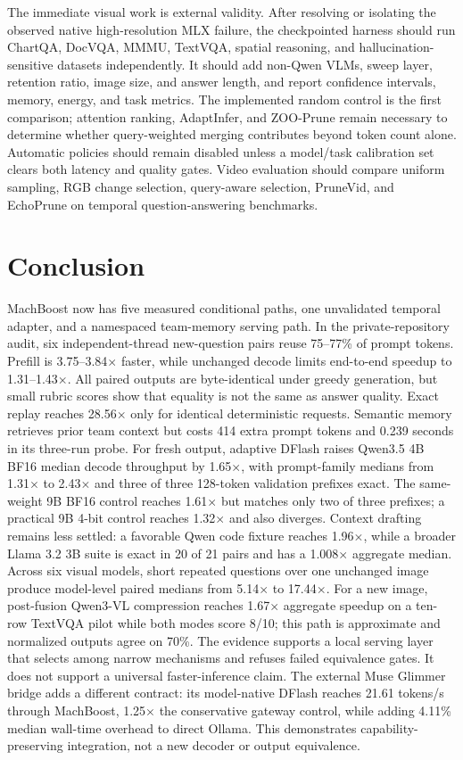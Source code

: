 \documentclass[11pt]{article}
\begin{document}
The immediate visual work is external validity. After resolving or isolating the observed native high-resolution MLX failure, the checkpointed harness should run ChartQA, DocVQA, MMMU, TextVQA, spatial reasoning, and hallucination-sensitive datasets independently. It should add non-Qwen VLMs, sweep layer, retention ratio, image size, and answer length, and report confidence intervals, memory, energy, and task metrics. The implemented random control is the first comparison; attention ranking, AdaptInfer, and ZOO-Prune remain necessary to determine whether query-weighted merging contributes beyond token count alone. Automatic policies should remain disabled unless a model/task calibration set clears both latency and quality gates. Video evaluation should compare uniform sampling, RGB change selection, query-aware selection, PruneVid, and EchoPrune on temporal question-answering benchmarks.

\section{Conclusion}
MachBoost now has five measured conditional paths, one unvalidated temporal adapter, and a namespaced team-memory serving path. In the private-repository audit, six independent-thread new-question pairs reuse 75--77\% of prompt tokens. Prefill is 3.75--3.84$\times$ faster, while unchanged decode limits end-to-end speedup to 1.31--1.43$\times$. All paired outputs are byte-identical under greedy generation, but small rubric scores show that equality is not the same as answer quality. Exact replay reaches 28.56$\times$ only for identical deterministic requests. Semantic memory retrieves prior team context but costs 414 extra prompt tokens and 0.239 seconds in its three-run probe. For fresh output, adaptive DFlash raises Qwen3.5 4B BF16 median decode throughput by 1.65$\times$, with prompt-family medians from 1.31$\times$ to 2.43$\times$ and three of three 128-token validation prefixes exact. The same-weight 9B BF16 control reaches 1.61$\times$ but matches only two of three prefixes; a practical 9B 4-bit control reaches 1.32$\times$ and also diverges. Context drafting remains less settled: a favorable Qwen code fixture reaches 1.96$\times$, while a broader Llama 3.2 3B suite is exact in 20 of 21 pairs and has a 1.008$\times$ aggregate median. Across six visual models, short repeated questions over one unchanged image produce model-level paired medians from 5.14$\times$ to 17.44$\times$. For a new image, post-fusion Qwen3-VL compression reaches 1.67$\times$ aggregate speedup on a ten-row TextVQA pilot while both modes score 8/10; this path is approximate and normalized outputs agree on 70\%. The evidence supports a local serving layer that selects among narrow mechanisms and refuses failed equivalence gates. It does not support a universal faster-inference claim.
The external Muse Glimmer bridge adds a different contract: its model-native
DFlash reaches 21.61 tokens/s through MachBoost, 1.25$\times$ the conservative
gateway control, while adding 4.11\% median wall-time overhead to direct Ollama.
This demonstrates capability-preserving integration, not a new decoder or
output equivalence.


\small

\end{document}
